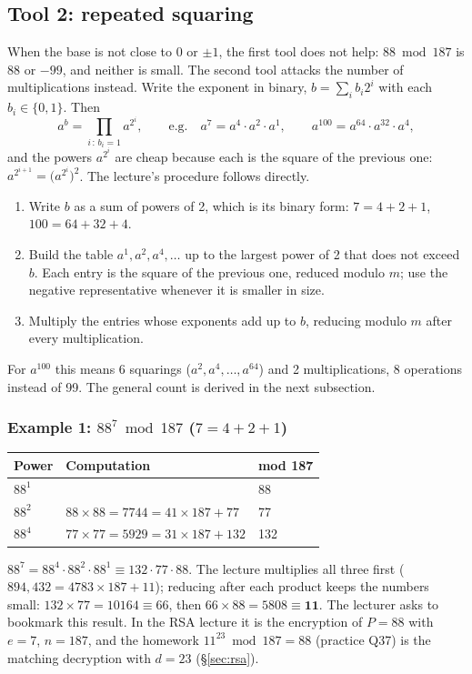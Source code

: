 \subsection{Tool 2: repeated squaring}
When the base is not close to 0 or $\pm 1$, the first tool does not help: $88 \bmod 187$ is 88 or $-99$, and neither is small. The second tool attacks the number of multiplications instead. Write the exponent in binary, $b = \sum_i b_i 2^i$ with each $b_i \in \{0, 1\}$. Then
\[
a^b = \prod_{i \,:\, b_i = 1} a^{2^i}, \qquad\text{e.g.}\quad a^7 = a^4 \cdot a^2 \cdot a^1, \qquad a^{100} = a^{64} \cdot a^{32} \cdot a^4 ,
\]
and the powers $a^{2^i}$ are cheap because each is the square of the previous one: $a^{2^{i+1}} = \big(a^{2^i}\big)^2$. The lecture's procedure follows directly.
\begin{enumerate}[leftmargin=1.6em,itemsep=1pt]
  \item Write $b$ as a sum of powers of 2, which is its binary form: $7 = 4 + 2 + 1$, $100 = 64 + 32 + 4$.
  \item Build the table $a^1, a^2, a^4, \dots$ up to the largest power of 2 that does not exceed $b$. Each entry is the square of the previous one, reduced modulo $m$; use the negative representative whenever it is smaller in size.
  \item Multiply the entries whose exponents add up to $b$, reducing modulo $m$ after every multiplication.
\end{enumerate}
For $a^{100}$ this means 6 squarings ($a^2, a^4, \dots, a^{64}$) and 2 multiplications, 8 operations instead of 99. The general count is derived in the next subsection.

\subsubsection*{Example 1: $88^7 \bmod 187$ \quad ($7 = 4 + 2 + 1$)}
\begin{center}\small
\begin{tabular}{@{}lll@{}}
\toprule
Power & Computation & mod 187\\
\midrule
$88^1$ & & 88\\
$88^2$ & $88 \times 88 = 7744 = 41 \times 187 + 77$ & 77\\
$88^4$ & $77 \times 77 = 5929 = 31 \times 187 + 132$ & 132\\
\bottomrule
\end{tabular}
\end{center}
$88^7 = 88^4 \cdot 88^2 \cdot 88^1 \equiv 132 \cdot 77 \cdot 88$. The lecture multiplies all three first ($894{,}432 = 4783 \times 187 + 11$); reducing after each product keeps the numbers small: $132 \times 77 = 10164 \equiv 66$, then $66 \times 88 = 5808 \equiv \mathbf{11}$. The lecturer asks to bookmark this result. In the RSA lecture it is the encryption of $P = 88$ with $e = 7$, $n = 187$, and the homework $11^{23} \bmod 187 = 88$ (practice Q37) is the matching decryption with $d = 23$ (\S\ref{sec:rsa}).

